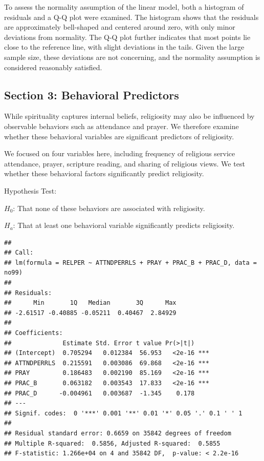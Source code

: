 \documentclass[
]{article}
\begin{document}
To assess the normality assumption of the linear model, both a histogram
of residuals and a Q-Q plot were examined. The histogram shows that the
residuals are approximately bell-shaped and centered around zero, with
only minor deviations from normality. The Q-Q plot further indicates
that most points lie close to the reference line, with slight deviations
in the tails. Given the large sample size, these deviations are not
concerning, and the normality assumption is considered reasonably
satisfied.

\subsection{Section 3: Behavioral
Predictors}\label{section-3-behavioral-predictors}

While spirituality captures internal beliefs, religiosity may also be
influenced by observable behaviors such as attendance and prayer. We
therefore examine whether these behavioral variables are significant
predictors of religiosity.

We focused on four variables here, including frequency of religious
service attendance, prayer, scripture reading, and sharing of religious
views. We test whether these behavioral factors significantly predict
religiosity.

Hypothesis Test:

\(H_0\): That none of these behaviors are associated with religiosity.

\(H_a\): That at least one behavioral variable significantly predicts
religiosity.

\begin{verbatim}
## 
## Call:
## lm(formula = RELPER ~ ATTNDPERRLS + PRAY + PRAC_B + PRAC_D, data = no99)
## 
## Residuals:
##      Min       1Q   Median       3Q      Max 
## -2.61517 -0.40885 -0.05211  0.40467  2.84929 
## 
## Coefficients:
##              Estimate Std. Error t value Pr(>|t|)    
## (Intercept)  0.705294   0.012384  56.953   <2e-16 ***
## ATTNDPERRLS  0.215591   0.003086  69.868   <2e-16 ***
## PRAY         0.186483   0.002190  85.169   <2e-16 ***
## PRAC_B       0.063182   0.003543  17.833   <2e-16 ***
## PRAC_D      -0.004961   0.003687  -1.345    0.178    
## ---
## Signif. codes:  0 '***' 0.001 '**' 0.01 '*' 0.05 '.' 0.1 ' ' 1
## 
## Residual standard error: 0.6659 on 35842 degrees of freedom
## Multiple R-squared:  0.5856, Adjusted R-squared:  0.5855 
## F-statistic: 1.266e+04 on 4 and 35842 DF,  p-value: < 2.2e-16
\end{verbatim}
\end{document}
